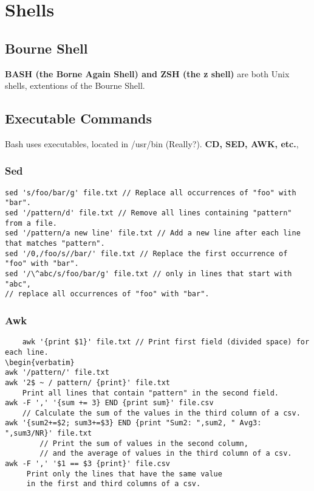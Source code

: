 
\chapter{Shells}

\section{Bourne Shell}

\textbf{BASH (the Borne Again Shell) and ZSH (the z shell)} are both Unix shells, extentions of the Bourne Shell.

\section{Executable Commands}

Bash uses executables, located in /usr/bin (Really?). \textbf{CD, SED, AWK, etc.}, 

\subsection{Sed}

\begin{verbatim}
sed 's/foo/bar/g' file.txt // Replace all occurrences of "foo" with "bar".
sed '/pattern/d' file.txt // Remove all lines containing "pattern" from a file.
sed '/pattern/a new line' file.txt // Add a new line after each line that matches "pattern".
sed '/0,/foo/s//bar/' file.txt // Replace the first occurrence of "foo" with "bar".
sed '/\^abc/s/foo/bar/g' file.txt // only in lines that start with "abc", 
// replace all occurrences of "foo" with "bar".
\end{verbatim}

\subsection{Awk}

\begin{verbatim}
    awk '{print $1}' file.txt // Print first field (divided space) for each line.
\begin{verbatim}
awk '/pattern/' file.txt
awk '2$ ~ / pattern/ {print}' file.txt 
    Print all lines that contain "pattern" in the second field.
awk -F ',' '{sum += 3} END {print sum}' file.csv 
    // Calculate the sum of the values in the third column of a csv.
awk '{sum2+=$2; sum3+=$3} END {print "Sum2: ",sum2, " Avg3: ",sum3/NR}' file.txt
        // Print the sum of values in the second column,
        // and the average of values in the third column of a csv.
awk -F ',' '$1 == $3 {print}' file.csv 
     Print only the lines that have the same value
     in the first and third columns of a csv.
\end{verbatim}

